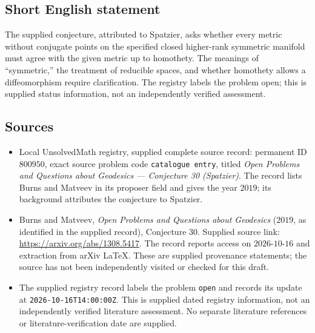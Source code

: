 \documentclass[11pt]{article}
\begin{document}
\subsection{Short English statement}
The supplied conjecture, attributed to Spatzier, asks whether every metric without conjugate points on the specified closed higher-rank symmetric manifold must agree with the given metric up to homothety. The meanings of ``symmetric,'' the treatment of reducible spaces, and whether homothety allows a diffeomorphism require clarification. The registry labels the problem open; this is supplied status information, not an independently verified assessment.
\subsection{Sources}
\begin{itemize}
\item Local UnsolvedMath registry, supplied complete source record: permanent ID \(800950\), exact source problem code \texttt{catalogue entry}, titled \emph{Open Problems and Questions about Geodesics --- Conjecture 30 (Spatzier)}. The record lists Burns and Matveev in its proposer field and gives the year \(2019\); its background attributes the conjecture to Spatzier.
\item Burns and Matveev, \emph{Open Problems and Questions about Geodesics} (\(2019\), as identified in the supplied record), Conjecture 30. Supplied source link: \url{https://arxiv.org/abs/1308.5417}. The record reports access on \(2026\text{-}10\text{-}16\) and extraction from arXiv LaTeX. These are supplied provenance statements; the source has not been independently visited or checked for this draft.
\item The supplied registry record labels the problem \texttt{open} and records its update at \texttt{2026-10-16T14:00:00Z}. This is supplied dated registry information, not an independently verified literature assessment. No separate literature references or literature-verification date are supplied.
\end{itemize}
\end{document}
